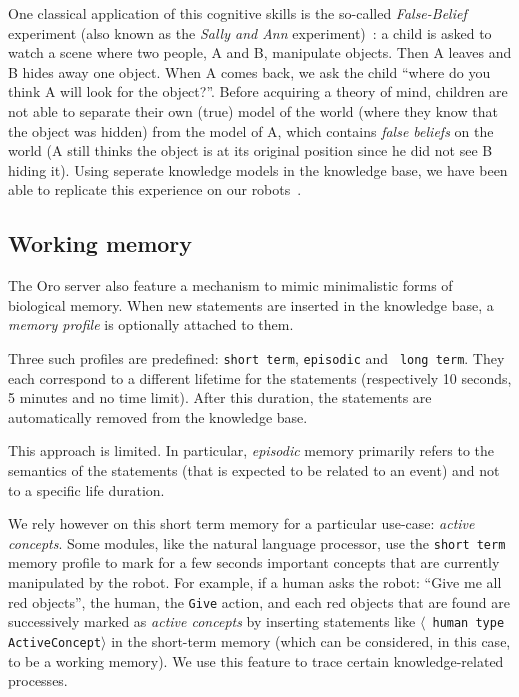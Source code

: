 \documentclass[letterpaper, 10 pt, conference]{ieeeconf}  %
\newcommand{\concept}[1]{{\small \texttt{#1}}}
\newcommand{\stmt}[1]{{\footnotesize \tt $\langle$ #1\relax$\rangle$}}
\begin{document}
One classical application of this cognitive skills is the so-called
\emph{False-Belief} experiment (also known as the \emph{Sally and Ann}
experiment)~\cite{Leslie2000}: a child is asked to watch a scene where two
people, A and B, manipulate objects. Then A leaves and B hides away one
object. When A comes back, we ask the child ``where do you think A will
look for the object?''. Before acquiring a theory of mind, children are not
able to separate their own (true) model of the world (where they know that
the object was hidden) from the model of A, which contains \emph{false
beliefs} on the world (A still thinks the object is at its original
position since he did not see B hiding it). Using seperate knowledge models
in the knowledge base, we have been able to replicate this experience on
our robots~\cite{Warnier2012a}.

\subsection{Working memory}

The {\sc Oro} server also feature a mechanism to mimic minimalistic forms of
biological memory.  When new statements are inserted in the knowledge base, a
\emph{memory profile} is optionally attached to them.

Three such profiles are predefined: {\tt short term}, {\tt episodic} and {\tt
long term}. They each correspond to a different lifetime for the statements
(respectively 10 seconds, 5 minutes and no time limit). After this duration,
the statements are automatically removed from the knowledge base.

This approach is limited. In particular, \emph{episodic} memory primarily
refers to the semantics of the statements (that is expected to be related to an
event) and not to a specific life duration.

We rely however on this short term memory for a particular use-case:
\emph{active concepts}. Some modules, like the natural language processor, use
the {\tt short term} memory profile to mark for a few seconds important
concepts that are currently manipulated by the robot. For example, if a human
asks the robot: ``Give me all red objects'', the human, the \concept{Give}
action, and each red objects that are found are successively marked as
\emph{active concepts} by inserting statements like \stmt{human type
ActiveConcept} in the short-term memory (which can be considered, in this case,
to be a working memory). We use this feature to trace certain knowledge-related
processes.
\end{document}
